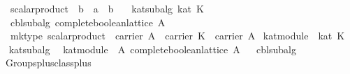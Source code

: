 \begin{isabellebody}
\ \ \ scalar{}product\ {}{}\ {}{}b\ {}\ {}a\ {}\ {}b{}\isanewline
\ \ \ kat{}subalg{}\ {}kat\ K{}\isanewline
\ \ \ cbl{}subalg{}\ {}complete{}boolean{}lattice\ A{}\isanewline
\ \ \ mk{}type{}\ {}scalar{}product\ {}\ carrier\ A\ {}\ carrier\ K\ {}\ carrier\ A{}\isanewline
\isanewline
{}\isamarkupfalse%
\ kat{}module{}\ {}\ kat\ K%
\isadelimproof
\ %
\endisadelimproof
%
\isatagproof
{}\isamarkupfalse%
\ kat{}subalg\ \isamarkupfalse%
%
\endisatagproof
{\isafoldproof}%
%
\isadelimproof
%
\endisadelimproof
\isanewline
{}\isamarkupfalse%
\ kat{}module{}\ {}\ A{}\ complete{}boolean{}lattice\ A%
\isadelimproof
\ %
\endisadelimproof
%
\isatagproof
{}\isamarkupfalse%
\ cbl{}subalg\ \isamarkupfalse%
%
\endisatagproof
{\isafoldproof}%
%
\isadelimproof
%
\endisadelimproof
\isanewline
\isanewline
{}\isamarkupfalse%
\isanewline
\ \ Groups{}plus{}class{}plus\ {}\ {}{}{}\ {}{}{}\ \isanewline

\end{isabellebody}

